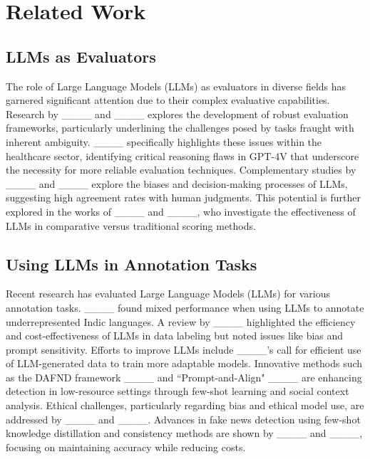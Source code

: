 \section{Related Work}
\subsection{LLMs as Evaluators}
The role of Large Language Models (LLMs) as evaluators in diverse fields has garnered significant attention due to their complex evaluative capabilities. Research by ____ and ____ explores the development of robust evaluation frameworks, particularly underlining the challenges posed by tasks fraught with inherent ambiguity. ____ specifically highlights these issues within the healthcare sector, identifying critical reasoning flaws in GPT-4V that underscore the necessity for more reliable evaluation techniques. Complementary studies by ____ and ____ explore the biases and decision-making processes of LLMs, suggesting high agreement rates with human judgments. This potential is further explored in the works of ____ and ____, who investigate the effectiveness of LLMs in comparative versus traditional scoring methods.

\subsection{Using LLMs in Annotation Tasks}
Recent research has evaluated Large Language Models (LLMs) for various annotation tasks. ____ found mixed performance when using LLMs to annotate underrepresented Indic languages. A review by ____ highlighted the efficiency and cost-effectiveness of LLMs in data labeling but noted issues like bias and prompt sensitivity. Efforts to improve LLMs include ____'s call for efficient use of LLM-generated data to train more adaptable models. Innovative methods such as the DAFND framework ____ and ``Prompt-and-Align" ____ are enhancing detection in low-resource settings through few-shot learning and social context analysis. Ethical challenges, particularly regarding bias and ethical model use, are addressed by ____ and ____. Advances in fake news detection using few-shot knowledge distillation and consistency methods are shown by ____ and ____, focusing on maintaining accuracy while reducing costs.

